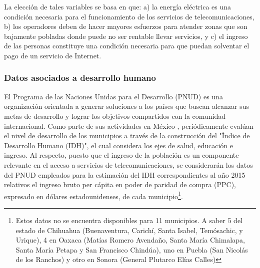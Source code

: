 \documentclass[9pt,twocolumn,twoside]{ilcss}
\begin{document}

La elección de tales variables se basa en que: a) la energía eléctrica es una condición necesaria para el funcionamiento de los servicios de telecomunicaciones, b) los operadores deben de hacer mayores esfuerzos para atender zonas que son bajamente pobladas donde puede no ser rentable llevar servicios, y c) el ingreso de las personas constituye una condición necesaria para que puedan solventar el pago de un servicio de Internet.
 
\subsubsection{Datos asociados a desarrollo humano}

El Programa de las Naciones Unidas para el Desarrollo (PNUD) es una organización orientada a generar soluciones a los países que buscan alcanzar sus metas de desarrollo y lograr los objetivos compartidos con la comunidad internacional. Como parte de sus actividades en México \cite{ONU2015}, periódicamente evalúan el nivel de desarrollo de los municipios a través de la construcción del "Índice de Desarrollo Humano (IDH)", el cual considera los ejes de salud, educación e ingreso. Al respecto, puesto que el ingreso de la población es un componente relevante en el acceso a servicios de telecomunicaciones, se considerarán los datos del PNUD empleados para la estimación del IDH correspondientes al año 2015 relativos el ingreso bruto per cápita en poder de paridad de compra (PPC), expresado en dólares estadounidenses, de cada municipio\footnote{Estos datos no se encuentra disponibles para 11 municipios. 
	A saber 5 del estado de Chihuahua (Buenaventura, Carichí, Santa Isabel, Temósachic, y Urique), 4 en Oaxaca (Matías Romero Avendaño, Santa María Chimalapa, Santa María Petapa y San Francisco Chindúa), uno en Puebla (San Nicolás de los Ranchos) y otro en Sonora (General Plutarco Elías Calles)
}.
\end{document}
